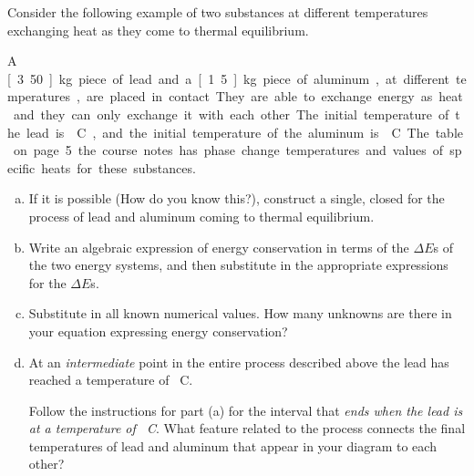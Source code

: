 \label{fnt1.2.1-2}

Consider the following example of two substances at different temperatures exchanging heat as they come to thermal equilibrium.

A \unit[3.50]{kg} piece of lead and a \unit[1.5]{kg} piece of aluminum, at different temperatures, are placed in contact. They are able to exchange energy as heat and they can only exchange it with each other. The initial temperature of the lead is \unit[48]{\textdegree C}, and the initial temperature of the aluminum is \unit[35]{\textdegree C}. The table on page 5 the course notes has phase change temperatures and values of specific heats for these substances. 

\begin{enumerate}[(a)]
	\item If it is possible (How do you know this?), construct a single, closed \EnergyDiagram{} for the process of lead and aluminum coming to thermal equilibrium.

	\item Write an algebraic expression of energy conservation in terms of the $\Delta E$s of the two energy systems, and then substitute in the appropriate expressions for the $\Delta E$s.

	\item Substitute in all known numerical values. How many unknowns are there in your equation expressing energy conservation?

	\item At an {\em intermediate} point in the entire process described above the lead has reached a temperature of \unit[43]{\textdegree C}.
	
	Follow the instructions for part (a) for the interval that \emph{ends when the lead is at a temperature of \unit[43]{\textdegree C}}. What feature related to the process connects the final temperatures of lead and aluminum that appear in your diagram to each other?

\end{enumerate}